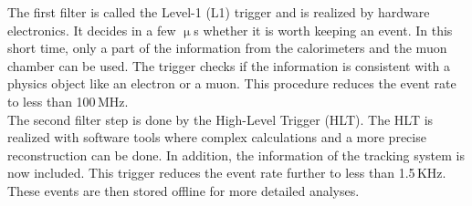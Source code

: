  The first filter is called the Level-1 (L1) trigger and is realized by hardware electronics. It decides in a few $\upmu$s whether it is worth keeping an event. In this short time, only a part of the information from the calorimeters and the muon chamber can be used. The trigger checks if the information is consistent with a physics object like an electron or a muon. This procedure reduces the event rate to less than 100\,MHz. \\

The second filter step is done by the High-Level Trigger (HLT). The HLT is realized with software tools where complex calculations and a more precise reconstruction can be done. In addition, the information of the tracking system is now included. This trigger reduces the event rate further to less than 1.5\,KHz. These events are then stored offline for more detailed analyses. 